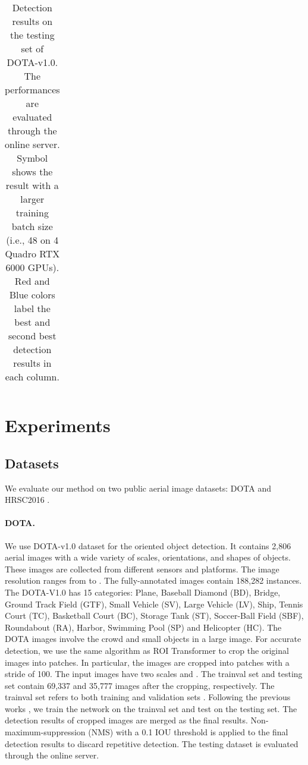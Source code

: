 \documentclass[10pt,twocolumn,letterpaper]{article}
\begin{document}
\begin{table*}[t!]
\begin{center}
{\begin{tabular}{l|c|ccccccccccccccc}
\bottomrule
\end{tabular}
}
\end{center}
\caption{Detection results on the testing set of DOTA-v1.0. The performances are evaluated through the online server. Symbol  shows the result with a larger training batch size (i.e., 48 on 4 Quadro RTX 6000 GPUs). {\color{red}Red} and {\color{blue}Blue} colors label the best and second best detection results in each column.}
\label{Table:Table1}
\end{table*} 
\section{Experiments}
\subsection{Datasets}
We evaluate our method on two public aerial image datasets: DOTA \cite{xia2018dota} and HRSC2016 \cite{icpram17}.

\paragraph{DOTA.} We use DOTA-v1.0  \cite{xia2018dota} dataset for the oriented object detection. It contains 2,806 aerial images with a wide variety of scales, orientations, and shapes of objects. These images are collected from different sensors and platforms. The image resolution ranges from  to . The fully-annotated images contain 188,282 instances. The DOTA-V1.0 has 15 categories: Plane, Baseball Diamond (BD),    Bridge,    Ground Track Field (GTF), Small Vehicle (SV), Large Vehicle    (LV), Ship, Tennis Court (TC), Basketball Court (BC), Storage Tank (ST), Soccer-Ball Field (SBF), Roundabout (RA), Harbor, Swimming Pool (SP) and Helicopter (HC). The DOTA images involve the crowd and small objects in a large image. For accurate detection, we use the same algorithm as ROI Transformer \cite{ding2019learning} to crop the original images into patches. In particular, the images are cropped into  patches with a stride of 100.  The input images have two scales  and .  The trainval set and testing set contain 69,337 and 35,777 images after the cropping, respectively. The trainval set refers to both training and validation sets \cite{ding2019learning}. Following the previous works \cite{azimi2018towards,ding2019learning}, we train the network on the trainval set and test on the testing set. The detection results of cropped images are merged as the final results. Non-maximum-suppression (NMS) with a 0.1 IOU threshold is applied to the final detection results to discard repetitive detection. The testing dataset is evaluated through the online server.
\end{document}
